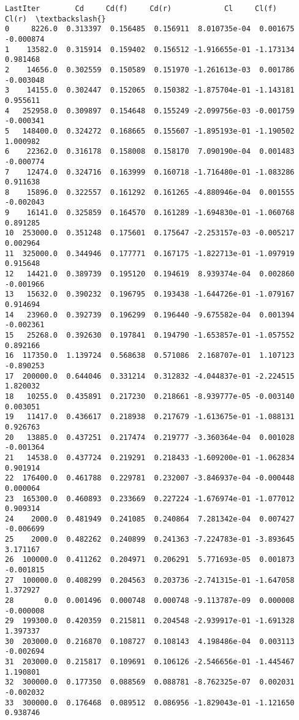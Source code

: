 \documentclass[11pt]{article}
\makeatletter
\newcommand{\boxspacing}{\kern\kvtcb@left@rule\kern\kvtcb@boxsep}
\newcommand{\prompt}[4]{
        {\ttfamily\llap{{\color{#2}[#3]:\hspace{3pt}#4}}\vspace{-\baselineskip}}
    }
\makeatother
\begin{document}
            \begin{tcolorbox}[breakable, size=fbox, boxrule=.5pt, pad at break*=1mm, opacityfill=0]
\prompt{Out}{outcolor}{203}{\boxspacing}
\begin{Verbatim}[commandchars=\\\{\}]
    LastIter        Cd     Cd(f)     Cd(r)            Cl     Cl(f)     Cl(r)  \textbackslash{}
0     8226.0  0.313397  0.156485  0.156911  8.010735e-04  0.001675 -0.000874
1    13582.0  0.315914  0.159402  0.156512 -1.916655e-01 -1.173134  0.981468
2    14656.0  0.302559  0.150589  0.151970 -1.261613e-03  0.001786 -0.003048
3    14155.0  0.302447  0.152065  0.150382 -1.875704e-01 -1.143181  0.955611
4   252958.0  0.309897  0.154648  0.155249 -2.099756e-03 -0.001759 -0.000341
5   148400.0  0.324272  0.168665  0.155607 -1.895193e-01 -1.190502  1.000982
6    22362.0  0.316178  0.158008  0.158170  7.090190e-04  0.001483 -0.000774
7    12474.0  0.324716  0.163999  0.160718 -1.716480e-01 -1.083286  0.911638
8    15896.0  0.322557  0.161292  0.161265 -4.880946e-04  0.001555 -0.002043
9    16141.0  0.325859  0.164570  0.161289 -1.694830e-01 -1.060768  0.891285
10  253000.0  0.351248  0.175601  0.175647 -2.253157e-03 -0.005217  0.002964
11  325000.0  0.344946  0.177771  0.167175 -1.822713e-01 -1.097919  0.915648
12   14421.0  0.389739  0.195120  0.194619  8.939374e-04  0.002860 -0.001966
13   15632.0  0.390232  0.196795  0.193438 -1.644726e-01 -1.079167  0.914694
14   23960.0  0.392739  0.196299  0.196440 -9.675582e-04  0.001394 -0.002361
15   25268.0  0.392630  0.197841  0.194790 -1.653857e-01 -1.057552  0.892166
16  117350.0  1.139724  0.568638  0.571086  2.168707e-01  1.107123 -0.890253
17  200000.0  0.644046  0.331214  0.312832 -4.044837e-01 -2.224515  1.820032
18   10255.0  0.435891  0.217230  0.218661 -8.939777e-05 -0.003140  0.003051
19   11417.0  0.436617  0.218938  0.217679 -1.613675e-01 -1.088131  0.926763
20   13885.0  0.437251  0.217474  0.219777 -3.360364e-04  0.001028 -0.001364
21   14538.0  0.437724  0.219291  0.218433 -1.609200e-01 -1.062834  0.901914
22  176400.0  0.461788  0.229781  0.232007 -3.846937e-04 -0.000448  0.000064
23  165300.0  0.460893  0.233669  0.227224 -1.676974e-01 -1.077012  0.909314
24    2000.0  0.481949  0.241085  0.240864  7.281342e-04  0.007427 -0.006699
25    2000.0  0.482262  0.240899  0.241363 -7.224783e-01 -3.893645  3.171167
26  100000.0  0.411262  0.204971  0.206291  5.771693e-05  0.001873 -0.001815
27  100000.0  0.408299  0.204563  0.203736 -2.741315e-01 -1.647058  1.372927
28       0.0  0.001496  0.000748  0.000748 -9.113787e-09  0.000008 -0.000008
29  199300.0  0.420359  0.215811  0.204548 -2.939917e-01 -1.691328  1.397337
30  203000.0  0.216870  0.108727  0.108143  4.198486e-04  0.003113 -0.002694
31  203000.0  0.215817  0.109691  0.106126 -2.546656e-01 -1.445467  1.190801
32  300000.0  0.177350  0.088569  0.088781 -8.762325e-07  0.002031 -0.002032
33  300000.0  0.176468  0.089512  0.086956 -1.829043e-01 -1.121650  0.938746


\end{Verbatim}
\end{tcolorbox}
\end{document}
